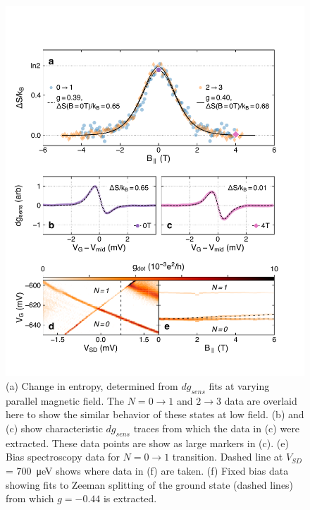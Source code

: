\documentclass[twocolumn,showpacs,amsmath,amssymb,prl,aps,superscriptaddress]{revtex4-1}
\begin{document}
\begin{figure}
        \includegraphics[width=1.0\columnwidth]{../figures/figure_3.pdf}
        \caption{\label{fig:fig3}(a) Change in entropy, determined from $dg_{sens}$ fits at varying parallel magnetic field. The $N=0 \rightarrow 1$ and $2 \rightarrow 3$ data are overlaid here to show the similar behavior of these states at low field. (b) and (c) show characteristic $dg_{sens}$ traces from which the data in (c) were extracted. These data points are show as large markers in (c). (e) Bias spectroscopy data for $N=0 \rightarrow 1$ transition. Dashed line at $V_{SD}$ = \SI{700}{\micro\electronvolt} shows where data in (f) are taken. (f) Fixed bias data showing fits to Zeeman splitting of the ground state (dashed lines) from which $g = -0.44$ is extracted.}
\end{figure}
\end{document}
